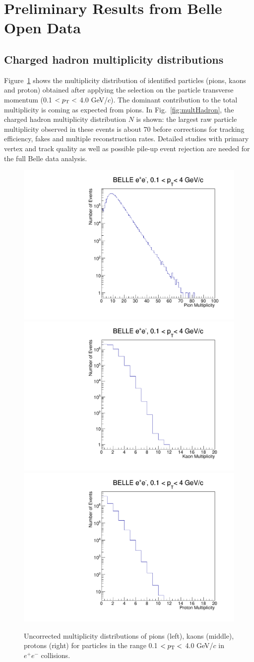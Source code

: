 \section{Preliminary Results from Belle Open Data}

\subsection{Charged hadron multiplicity distributions}

Figure~\ref{fig:multPID} shows the multiplicity distribution of identified particles (pions, kaons and proton) obtained after 
applying the selection on the particle transverse momentum (0.1 $<p_{\rm T}<$ 4.0 GeV/$c$). 
The dominant contribution to the total multiplicity is coming as expected from pions.
In Fig.~\ref{fig:multHadron}, the charged hadron multiplicity distribution $N$ is shown: the largest raw particle multiplicity observed in these events is about 70 before corrections for tracking efficiency, fakes and multiple reconstruction rates. Detailed studies with primary vertex and track quality as well as possible pile-up event rejection are needed for the full Belle data analysis. 

\begin{figure}[!htb]
\begin{center}
\includegraphics[width=.32\textwidth]{figures/pion_mult.pdf}
\includegraphics[width=.32\textwidth]{figures/kaon_mult.pdf}
\includegraphics[width=.32\textwidth]{figures/proton_mult.pdf}
\caption{Uncorrected multiplicity distributions of pions (left), kaons (middle), protons (right) for  particles in the range  0.1 $<p_{\rm T}<$ 4.0 GeV/$c$ in $e^{+}e^{-}$ collisions. }
\label{fig:multPID} 
\end{center}
\end{figure}

